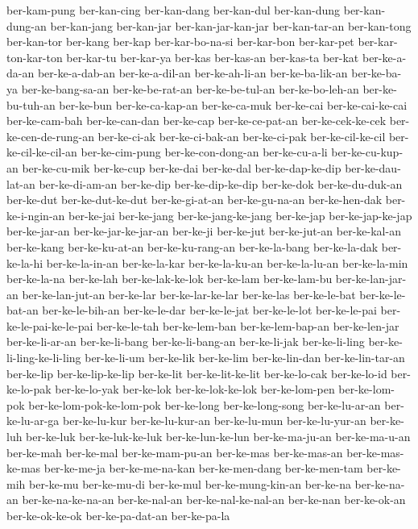 {ber-kam-pung ber-kan-cing ber-kan-dang ber-kan-dul ber-kan-dung
ber-kan-dung-an ber-kan-jang ber-kan-jar ber-kan-jar-kan-jar
ber-kan-tar-an ber-kan-tong ber-kan-tor ber-kang ber-kap ber-kar-bo-na-si
ber-kar-bon ber-kar-pet ber-kar-ton-kar-ton ber-kar-tu ber-kar-ya ber-kas
ber-kas-an ber-kas-ta ber-kat ber-ke-a-da-an ber-ke-a-dab-an
ber-ke-a-dil-an ber-ke-ah-li-an ber-ke-ba-lik-an ber-ke-ba-ya
ber-ke-bang-sa-an ber-ke-be-rat-an ber-ke-be-tul-an ber-ke-bo-leh-an
ber-ke-bu-tuh-an ber-ke-bun ber-ke-ca-kap-an ber-ke-ca-muk ber-ke-cai
ber-ke-cai-ke-cai ber-ke-cam-bah ber-ke-can-dan ber-ke-cap
ber-ke-ce-pat-an ber-ke-cek-ke-cek ber-ke-cen-de-rung-an ber-ke-ci-ak
ber-ke-ci-bak-an ber-ke-ci-pak ber-ke-cil-ke-cil ber-ke-cil-ke-cil-an
ber-ke-cim-pung ber-ke-con-dong-an ber-ke-cu-a-li ber-ke-cu-kup-an
ber-ke-cu-mik ber-ke-cup ber-ke-dai ber-ke-dal ber-ke-dap-ke-dip
ber-ke-dau-lat-an ber-ke-di-am-an ber-ke-dip ber-ke-dip-ke-dip ber-ke-dok
ber-ke-du-duk-an ber-ke-dut ber-ke-dut-ke-dut ber-ke-gi-at-an
ber-ke-gu-na-an ber-ke-hen-dak ber-ke-i-ngin-an ber-ke-jai ber-ke-jang
ber-ke-jang-ke-jang ber-ke-jap ber-ke-jap-ke-jap ber-ke-jar-an
ber-ke-jar-ke-jar-an ber-ke-ji ber-ke-jut ber-ke-jut-an ber-ke-kal-an
ber-ke-kang ber-ke-ku-at-an ber-ke-ku-rang-an ber-ke-la-bang ber-ke-la-dak
ber-ke-la-hi ber-ke-la-in-an ber-ke-la-kar ber-ke-la-ku-an ber-ke-la-lu-an
ber-ke-la-min ber-ke-la-na ber-ke-lah ber-ke-lak-ke-lok ber-ke-lam
ber-ke-lam-bu ber-ke-lan-jar-an ber-ke-lan-jut-an ber-ke-lar
ber-ke-lar-ke-lar ber-ke-las ber-ke-le-bat ber-ke-le-bat-an
ber-ke-le-bih-an ber-ke-le-dar ber-ke-le-jat ber-ke-le-lot ber-ke-le-pai
ber-ke-le-pai-ke-le-pai ber-ke-le-tah ber-ke-lem-ban ber-ke-lem-bap-an
ber-ke-len-jar ber-ke-li-ar-an ber-ke-li-bang ber-ke-li-bang-an
ber-ke-li-jak ber-ke-li-ling ber-ke-li-ling-ke-li-ling ber-ke-li-um
ber-ke-lik ber-ke-lim ber-ke-lin-dan ber-ke-lin-tar-an ber-ke-lip
ber-ke-lip-ke-lip ber-ke-lit ber-ke-lit-ke-lit ber-ke-lo-cak ber-ke-lo-id
ber-ke-lo-pak ber-ke-lo-yak ber-ke-lok ber-ke-lok-ke-lok ber-ke-lom-pen
ber-ke-lom-pok ber-ke-lom-pok-ke-lom-pok ber-ke-long ber-ke-long-song
ber-ke-lu-ar-an ber-ke-lu-ar-ga ber-ke-lu-kur ber-ke-lu-kur-an
ber-ke-lu-mun ber-ke-lu-yur-an ber-ke-luh ber-ke-luk ber-ke-luk-ke-luk
ber-ke-lun-ke-lun ber-ke-ma-ju-an ber-ke-ma-u-an ber-ke-mah ber-ke-mal
ber-ke-mam-pu-an ber-ke-mas ber-ke-mas-an ber-ke-mas-ke-mas ber-ke-me-ja
ber-ke-me-na-kan ber-ke-men-dang ber-ke-men-tam ber-ke-mih ber-ke-mu
ber-ke-mu-di ber-ke-mul ber-ke-mung-kin-an ber-ke-na ber-ke-na-an
ber-ke-na-ke-na-an ber-ke-nal-an ber-ke-nal-ke-nal-an ber-ke-nan
ber-ke-ok-an ber-ke-ok-ke-ok ber-ke-pa-dat-an ber-ke-pa-la
}
